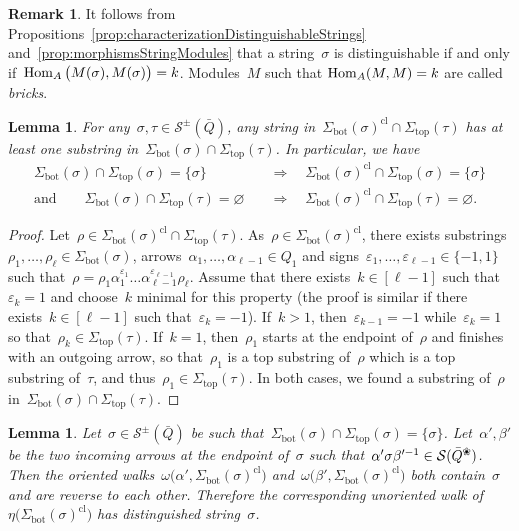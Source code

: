 \documentclass{memo-l}
\newtheorem{lemma}[theorem]{Lemma}
\theoremstyle{definition}
\newtheorem{remark}[theorem]{Remark}
\newcommand{\darkblue}{\color{darkblue}} %
\newcommand{\defn}[1]{\textsl{\darkblue #1}} %
\newcommand{\blossom}{^\text{\ding{96}}} %
\newcommand{\strings}{\mathcal{S}} %
\renewcommand{\top}{\mathrm{top}} %
\newcommand{\bottom}{\mathrm{bot}} %
\newcommand{\closure}[1]{#1^{\mathrm{cl}}} %
\newcommand{\Hom}[1]{\operatorname{{\rm Hom}}_{#1}}
\begin{document}
\begin{remark}
It follows from Propositions~\ref{prop:characterizationDistinguishableStrings} and~\ref{prop:morphismsStringModules} that a string~$\sigma$ is distinguishable if and only if~$\Hom{A} \big( M(\sigma), M(\sigma) \big) = k$.
Modules~$M$ such that ${\Hom{A}(M, M) = k}$ are called \defn{bricks}.
\end{remark}

\begin{lemma}
\label{lem:sigmaBottomCapSigmaTop}
For any~$\sigma, \tau \in \strings^\pm(\bar Q)$, any string in~$\closure{\Sigma_\bottom(\sigma)} \cap \Sigma_\top(\tau)$ has at least one substring in~$\Sigma_\bottom(\sigma) \cap \Sigma_\top(\tau)$. In particular, we have
\begin{align*}
\Sigma_\bottom(\sigma) \cap \Sigma_\top(\sigma) = \{\sigma\} & \quad \Longrightarrow \quad \closure{\Sigma_\bottom(\sigma)} \cap \Sigma_\top(\sigma) = \{\sigma\} \\
\text{and}\qquad
\Sigma_\bottom(\sigma) \cap \Sigma_\top(\tau) = \varnothing & \quad \Longrightarrow \quad \closure{\Sigma_\bottom(\sigma)} \cap \Sigma_\top(\tau) = \varnothing.
\end{align*}
\end{lemma}

\begin{proof}
Let~$\rho \in \closure{\Sigma_\bottom(\sigma)} \cap \Sigma_\top(\tau)$.
As~$\rho \in \closure{\Sigma_\bottom(\sigma)}$, there exists substrings $\rho_1, \dots, \rho_\ell \in \Sigma_\bottom(\sigma)$, arrows~$\alpha_1, \dots, \alpha_{\ell-1} \in Q_1$ and signs~${\varepsilon_1, \dots, \varepsilon_{\ell-1} \in \{-1,1\}}$ such that~$\rho = \rho_1 \alpha_1^{\varepsilon_1} \dots \alpha_{\ell-1}^{\varepsilon_{\ell-1}} \rho_\ell$.
Assume that there exists~$k \in [\ell-1]$ such that~$\varepsilon_k = 1$ and choose~$k$ minimal for this property (the proof is similar if there exists~$k \in [\ell-1]$ such that~$\varepsilon_k = -1$).
If~$k > 1$, then~$\varepsilon_{k-1} = -1$ while~$\varepsilon_k = 1$ so that~$\rho_k \in \Sigma_\top(\tau)$.
If~$k = 1$, then~$\rho_1$ starts at the endpoint of~$\rho$ and finishes with an outgoing arrow, so that~$\rho_1$ is a top substring of~$\rho$ which is a top substring of~$\tau$, and thus~$\rho_1 \in \Sigma_\top(\tau)$.
In both cases, we found a substring of~$\rho$ in~$\Sigma_\bottom(\sigma) \cap \Sigma_\top(\tau)$.
\end{proof}

\begin{lemma}
\label{lem:bijectionDistinguishableStringsWalks}
Let~$\sigma \in \strings^\pm(\bar Q)$ be such that~$\Sigma_\bottom(\sigma) \cap \Sigma_\top(\sigma) = \{\sigma\}$.
Let~$\alpha', \beta'$ be the two incoming arrows at the endpoint of~$\sigma$ such that~$\alpha'\sigma\beta'^{-1} \in \strings(\bar Q\blossom)$.
Then the oriented walks~$\omega \big( \alpha', \closure{\Sigma_\bottom(\sigma)} \big)$ and~$\omega \big( \beta', \closure{\Sigma_\bottom(\sigma)} \big)$ both contain~$\sigma$ and are reverse to each other. Therefore the corresponding unoriented walk of~$\eta \big( \closure{\Sigma_\bottom(\sigma)} \big)$ has distinguished string~$\sigma$.
\end{lemma}
\end{document}
